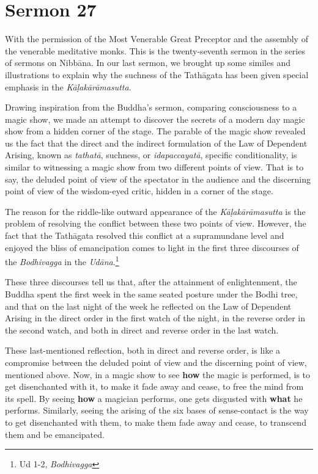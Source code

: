 \chapter{Sermon 27}

\NibbanaOpeningQuote

With the permission of the Most Venerable Great Preceptor and the assembly of the venerable meditative monks. This is the twenty-seventh sermon in the series of sermons on Nibbāna. In our last sermon, we brought up some similes and illustrations to explain why the suchness of the Tathāgata has been given special emphasis in the \emph{Kāḷakārāmasutta}.

Drawing inspiration from the Buddha's sermon, comparing consciousness to a magic show, we made an attempt to discover the secrets of a modern day magic show from a hidden corner of the stage. The parable of the magic show revealed us the fact that the direct and the indirect formulation of the Law of Dependent Arising, known as \emph{tathatā}, suchness, or \emph{idapaccayatā}, specific conditionality, is similar to witnessing a magic show from two different points of view. That is to say, the deluded point of view of the spectator in the audience and the discerning point of view of the wisdom-eyed critic, hidden in a corner of the stage.

\clearpage

The reason for the riddle-like outward appearance of the \emph{Kāḷakārāmasutta} is the problem of resolving the conflict between these two points of view. However, the fact that the Tathāgata resolved this conflict at a supramundane level and enjoyed the bliss of emancipation comes to light in the first three discourses of the \emph{Bodhivagga} in the \emph{Udāna}.\footnote{Ud 1-2, \emph{Bodhivagga}}

These three discourses tell us that, after the attainment of enlightenment, the Buddha spent the first week in the same seated posture under the Bodhi tree, and that on the last night of the week he reflected on the Law of Dependent Arising in the direct order in the first watch of the night, in the reverse order in the second watch, and both in direct and reverse order in the last watch.

These last-mentioned reflection, both in direct and reverse order, is like a compromise between the deluded point of view and the discerning point of view, mentioned above. Now, in a magic show to see \textbf{how} the magic is performed, is to get disenchanted with it, to make it fade away and cease, to free the mind from its spell. By seeing \textbf{how} a magician performs, one gets disgusted with \textbf{what} he performs. Similarly, seeing the arising of the six bases of sense-contact is the way to get disenchanted with them, to make them fade away and cease, to transcend them and be emancipated.

